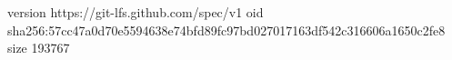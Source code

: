 version https://git-lfs.github.com/spec/v1
oid sha256:57cc47a0d70e5594638e74bfd89fc97bd027017163df542c316606a1650c2fe8
size 193767
